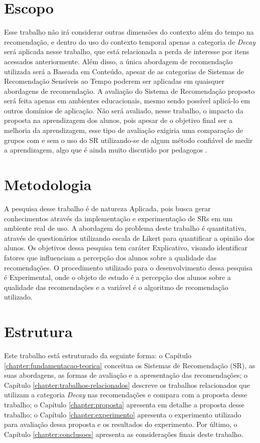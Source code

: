 \section{Escopo}

Esse trabalho não irá considerar outras dimensões do contexto além do tempo na recomendação, e dentro do uso do contexto
temporal apenas a categoria de \textit{Decay} será aplicada nesse trabalho, que está relacionada a perda de interesse por
itens acessados anteriormente. Além disso, a única abordagem de recomendação utilizada será a Baseada em Conteúdo,
apesar de as categorias de Sistemas de Recomendação Sensíveis ao Tempo poderem ser aplicadas em quaisquer abordagens de
recomendação. A avaliação do Sistema de Recomendação proposto será feita apenas em ambientes educacionais, mesmo sendo
possível aplicá-lo em outros domínios de aplicação. Não será avaliado, nesse trabalho, o impacto da proposta na
aprendizagem dos alunos, pois apesar de o objetivo final ser a melhoria da aprendizagem, esse tipo de avaliação exigiria uma
comparação de grupos com e sem o uso do SR utilizando-se de algum método confiável de medir a
aprendizagem, algo que é ainda muito discutido por pedagogos \cite{luckesi2014avaliaccao}.

\section{Metodologia}

A pesquisa desse trabalho é de natureza Aplicada, pois busca gerar conhecimentos através da implementação e experimentação
de SRs em um ambiente real de uso. A abordagem do problema deste trabalho é quantitativa, através de questionários utilizando
escala de Likert para quantificar a opinião dos alunos. Os objetivos dessa pesquisa tem caráter Explicativo, visando
identificar fatores que influenciam a percepção dos alunos sobre a qualidade das recomendações. O procedimento utilizado
para o desenvolvimento dessa pesquisa é Experimental, onde o objeto de estudo é a percepção dos alunos sobre a qualidade
das recomendações e a variável é o algoritmo de recomendação utilizado.

\section{Estrutura}

Este trabalho está estruturado da seguinte forma: o Capítulo \ref{chapter:fundamentacao-teorica} conceitua os Sistemas de
Recomendação (SR), as suas abordagens, as formas de avaliação e a apresentação das recomendações; o Capítulo \ref{chapter:trabalhos-relacionados}
descreve os trabalhos relacionados que utilizam a categoria \textit{Decay} nas recomendações e compara com a proposta desse
trabalho; o Capítulo \ref{chapter:proposta} apresenta em detalhe a proposta desse trabalho; o Capítulo \ref{chapter:experimento}
apresenta o experimento utilizado para avaliação dessa proposta e os resultados do experimento. Por último, o Capítulo \ref{chapter:conclusoes} apresenta
as considerações finais deste trabalho.


